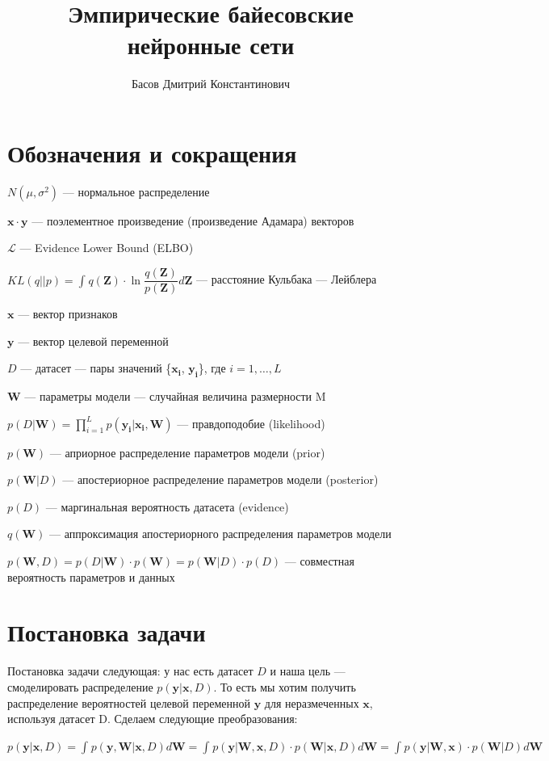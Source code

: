 \documentclass{article}
\title{Эмпирические байесовские нейронные сети}
\author{Басов Дмитрий Константинович}
\date{}
\begin{document}
\maketitle

\section{Обозначения и сокращения}
$N(\mu, \sigma^2)$ — нормальное распределение

$\mathbf{x} \cdot \mathbf{y}$ — поэлементное произведение (произведение Адамара) векторов

$\mathcal{L}$ — Evidence Lower Bound (ELBO)

$KL(q || p) = \int_{}{} q(\mathbf{Z}) \cdot \ln{\dfrac{q(\mathbf{Z})}{p(\mathbf{Z})}} d\mathbf{Z}$ — расстояние Кульбака — Лейблера

$\mathbf{x}$ — вектор признаков

$\mathbf{y}$ — вектор целевой переменной

$D$ — датасет — пары значений \{$\mathbf{x_i}$, $\mathbf{y_i}$\}, где $i = 1, \dots, L$

$\mathbf{W}$ — параметры модели — случайная величина размерности M

$p(D | \mathbf{W}) = \prod_{i=1}^{L} p(\mathbf{y_i} | \mathbf{x_i}, \mathbf{W})$ — правдоподобие (likelihood)

$p(\mathbf{W})$ — априорное распределение параметров модели (prior)

$p(\mathbf{W}| D)$ — апостериорное распределение параметров модели (posterior)

$p(D)$ — маргинальная вероятность датасета (evidence)

$q(\mathbf{W})$ — аппроксимация апостериорного распределения параметров модели

$p(\mathbf{W}, D) =
p(D | \mathbf{W}) \cdot p(\mathbf{W}) =
p(\mathbf{W}| D)\cdot p(D)$
— совместная вероятность параметров и данных

\section{Постановка задачи}
Постановка задачи следующая: у нас есть датасет $D$ и наша цель — смоделировать распределение $p(\mathbf{y} | \mathbf{x}, D)$. То есть мы хотим получить распределение вероятностей целевой переменной $\mathbf{y}$ для неразмеченных $\mathbf{x}$, используя датасет D. Сделаем следующие преобразования:

$p(\mathbf{y} | \mathbf{x}, D) =
\int_{}{} p(\mathbf{y}, \mathbf{W} | \mathbf{x}, D) d\mathbf{W} =
\int_{}{} p(\mathbf{y} | \mathbf{W}, \mathbf{x}, D) \cdot p(\mathbf{W} | \mathbf{x}, D) d\mathbf{W} =
\int_{}{} p(\mathbf{y} | \mathbf{W}, \mathbf{x}) \cdot p(\mathbf{W} | D) d\mathbf{W}$
\end{document}
